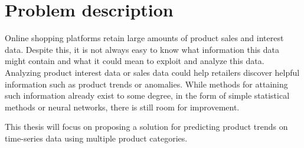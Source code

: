 
\section{Problem description}
\label{section:Introduction:ProblemDescription}
Online shopping platforms retain large amounts of product sales and interest data.
Despite this, it is not always easy to know what information this data might contain and what it could mean to exploit and analyze this data.
Analyzing product interest data or sales data could help retailers discover helpful information such as product trends or anomalies.
While methods for attaining such information already exist to some degree, in the form of simple statistical methods or neural networks,
there is still room for improvement.


This thesis will focus on proposing a solution for predicting product trends on time-series data using multiple product categories.


